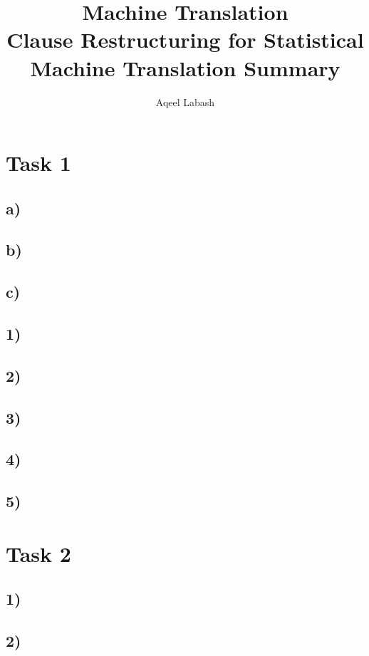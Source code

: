 \documentclass[10pt]{article}
\date{\vspace{-11.5ex}}
\author{\vspace{-10ex}}
\author{\large{Aqeel Labash}\vspace{4ex}}
\title{\vspace{-15ex}\huge{Machine Translation}\\\LARGE{Clause Restructuring for Statistical Machine Translation Summary}\vspace{-2ex}}
\begin{document}
\maketitle
\begin{multicols*}{2}

\section*{Task 1}
\subsection*{a)}
\subsection*{b)}
\subsection*{c)}
\subsection*{1)}
\subsection*{2)}
\subsection*{3)}
\subsection*{4)}
\subsection*{5)}
\section*{Task 2}
\subsection*{1)}
\subsection*{2)}

\end{multicols*}
\end{document}
